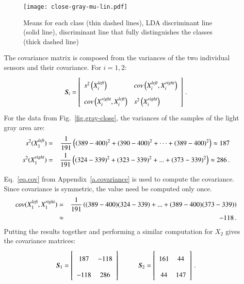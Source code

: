 \begin{figure}
\begin{center}
\texttt{[image: close-gray-mu-lin.pdf]}
\end{center}
\caption{Means for each class (thin dashed lines), LDA discriminant line (solid line), discriminant line that fully distinguishes the classes (thick dashed line)}\label{fig.gray-close-mu-lin}
\end{figure}

The covariance matrix is composed from the variances of the two individual sensors and their covariance. For $i=1,2$:
\[
\vec{S}_i = \left[
\renewcommand{\arraystretch}{2}
\begin{array}{l@{\hspace{1em}}l}
s^2\left(X_i^{\sub{left}}\right) &
\textit{cov}\left(X_i^{\sub{left}}, X_i^{\sub{right}}\right)\\
\textit{cov}\left(X_i^{\sub{right}},X_i^{\sub{left}}\right)&
s^2\left(X_i^{\sub{right}}\right)
\end{array}
\right]\,.
\]
For the data from Fig.~\ref{fig.gray-close}, the variances of the samples of the light gray area are:
\begin{eqnarray*}
s^2(X_1^{\textit{\scriptsize left}}) &=& \frac{1}{191} \left((389 - 400)^2 + (390 - 400)^2 + \cdots + (389 - 400)^2 \right) \approx 187 \\
s^2(X_1^{\textit{\scriptsize right}}) &=& \frac{1}{191} \left((324 - 339)^2 + (323 - 339)^2 + ... + (373 - 339)^2 \right) \approx 286\,.
\end{eqnarray*}

Eq.~\ref{eq.cov} from Appendix~\ref{a.covariance} is used to compute the covariance. Since covariance is symmetric, the value need be computed only once.
\begin{eqnarray*}
\textit{cov}(X_1^{\textit{\scriptsize left}}, X_1^{\textit{\scriptsize right}}) &=& \frac{1}{191} \left((389 - 400)(324 - 339) + ... + (389 - 400)(373 - 339) \right)\\
&\approx& -118\,.
\end{eqnarray*}
Putting the results together and performing a similar computation for $X_2$ gives the covariance matrices:
\[
\vec{S}_1 = \left[ \begin{array}{c} 187\\-118\end{array} \begin{array}{c} -118\\286 \end{array}\right]
\hspace{10mm}
\vec{S}_2 = \left[ \begin{array}{c} 161\\44\end{array} \begin{array}{c} 44\\147 \end{array}\right]\,.
\]


